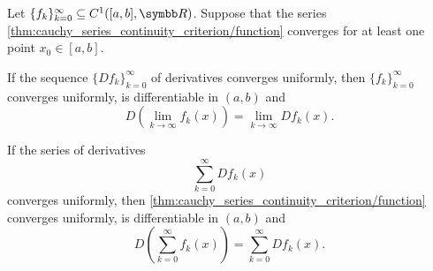 \begin{corollary}\label{thm:derivative_limit_exchange}\cite[theorem 7.17]{Rudin1976}
  Let \( \{ f_k \}_{k=0}^\infty \subseteq C^1([a, b], \BR) \). Suppose that the series \cref{thm:cauchy_series_continuity_criterion/function} converges for at least one point \( x_0 \in [a, b] \).

  \begin{thmenum}
     If the sequence \( \{ D f_k \}_{k=0}^\infty \) of derivatives converges uniformly, then \( \{ f_k \}_{k=0}^\infty \) converges uniformly, is differentiable in \( (a, b) \) and
    \begin{equation*}
      D\left(\lim_{k \to \infty} f_k(x) \right) = \lim_{k \to \infty} D f_k(x).
    \end{equation*}

     If the series of derivatives
    \begin{equation}\label{thm:derivative_limit_exchange/derivative_series}
      \sum_{k=0}^\infty D f_k(x)
    \end{equation}
    converges uniformly, then \cref{thm:cauchy_series_continuity_criterion/function} converges uniformly, is differentiable in \( (a, b) \) and
    \begin{equation*}
      D\left(\sum_{k=0}^\infty f_k(x)\right) = \sum_{k=0}^\infty D f_k(x).
    \end{equation*}
  \end{thmenum}
\end{corollary}

